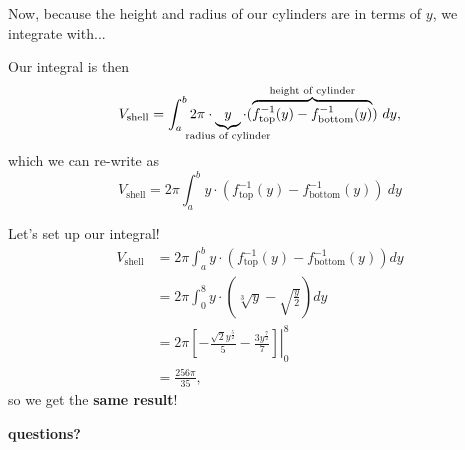 \documentclass[11pt,serif,aspectratio=169]{beamer}
\newcommand{\inverse}[1]{#1^{-1}}
\begin{document}
	\begin{frame}
		Now, because the height and radius of our cylinders are in terms of $y$, we integrate with...	
	\end{frame}
	
	\begin{frame}
		Our integral is then $$ V_\text{shell} = \int_a^b 2 \pi \cdot \underbrace{y}_{\mathclap{\text{radius of cylinder}}} \cdot (\overbrace{\inverse f_\text{top}(y) - \inverse f_\text{bottom}(y)}^{\mathclap{\text{height of cylinder}}})\ dy,$$ which we can re-write as $$ V_\text{shell} = 2\pi \int_a^b y \cdot (\inverse f_\text{top}(y) - \inverse f_\text{bottom}(y))\ dy$$
	\end{frame}
	
	\begin{frame}
		Let's set up our integral!
		\begin{align*}
			V_\text{shell} &= 2\pi \int_a^b y \cdot (\inverse f_\text{top}(y) - \inverse f_\text{bottom}(y)) dy \\
			&= 2\pi \int_0^8 y \cdot \left(\sqrt[3]{y} - \sqrt{\frac y2} \right) dy \\
			&= 2\pi \left. \left[-\frac{\sqrt 2 y^{\frac 52}}{5} - \frac{3 y^{\frac 72}}{7} \right] \right|_0^8 \\
			&= \frac{256 \pi}{35},
		\end{align*}
		so we get the \textbf{same result}!
	\end{frame}
	
	\begin{frame}\Large \bf \centering
		questions?	
	\end{frame}


	
\end{document}
